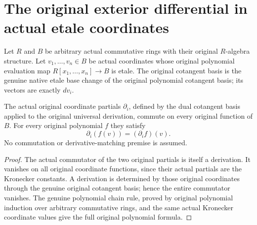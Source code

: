 \section{The original exterior differential in actual etale coordinates}
\label{sec:etale-coordinate-de-rham}

Let $R$ and $B$ be arbitrary actual commutative rings with their original
$R$-algebra structure. Let $v_1,\ldots,v_n\in B$ be actual coordinates whose
original polynomial evaluation map $R[x_1,\ldots,x_n]\to B$ is etale.
The original cotangent basis is the genuine native etale base change of the
original polynomial cotangent basis; its vectors are exactly $d v_i$.

\begin{theorem}
\label{lem:cartier-etale-original-partials}
\leanok
The actual original coordinate partials $\partial_i$, defined by the dual
cotangent basis applied to the original universal derivation, commute on every
original function of $B$. For every original polynomial $f$ they satisfy
\[
 \partial_i(f(v))=(\partial_i f)(v).
\]
No commutation or derivative-matching premise is assumed.
\end{theorem}
\begin{proof}
The actual commutator of the two original partials is itself a derivation.
It vanishes on all original coordinate functions, since their actual partials
are the Kronecker constants. A derivation is determined by those original
coordinates through the genuine original cotangent basis; hence the entire
commutator vanishes. The genuine polynomial chain rule, proved by original
polynomial induction over arbitrary commutative rings, and the same actual
Kronecker coordinate values give the full original polynomial formula.
\end{proof}

